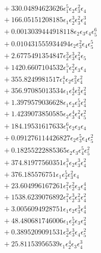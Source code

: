 \documentclass[10pt]{article}
\begin{document}
\begin{align*}
&{}  + 330.04894623626 \epsilon_{1}^{5} \epsilon_{2} \epsilon_{3}^{2} \epsilon_{4} \\
&{}  + 166.05151208185 \epsilon_{1} \epsilon_{2}^{3} \epsilon_{3}^{2} \epsilon_{4}^{3} \\
&{}  + 0.0013039444918118 \epsilon_{2} \epsilon_{3} \epsilon_{4} \epsilon_{5}^{6} \\
&{}  + 0.010431555934494 \epsilon_{2} \epsilon_{3}^{2} \epsilon_{4} \epsilon_{5}^{5} \\
&{}  + 2.6775491354847 \epsilon_{2}^{3} \epsilon_{3}^{3} \epsilon_{4}^{2} \epsilon_{5} \\
&{}  + 1420.6607104532 \epsilon_{1}^{5} \epsilon_{2}^{2} \epsilon_{3} \epsilon_{4} \\
&{}  + 355.8249981517 \epsilon_{1}^{4} \epsilon_{2} \epsilon_{3}^{2} \epsilon_{4}^{2} \\
&{}  + 356.97085013534 \epsilon_{1} \epsilon_{2}^{4} \epsilon_{3}^{2} \epsilon_{4}^{2} \\
&{}  + 1.3979579036628 \epsilon_{1} \epsilon_{2} \epsilon_{3}^{5} \epsilon_{4}^{2} \\
&{}  + 1.4239073850585 \epsilon_{2} \epsilon_{3}^{4} \epsilon_{4}^{2} \epsilon_{5}^{2} \\
&{}  + 184.19531617633 \epsilon_{1}^{6} \epsilon_{2} \epsilon_{3} \epsilon_{4} \\
&{}  + 0.091276114426827 \epsilon_{2} \epsilon_{3}^{5} \epsilon_{4} \epsilon_{5}^{2} \\
&{}  + 0.18255222885365 \epsilon_{2} \epsilon_{3} \epsilon_{4}^{5} \epsilon_{5}^{2} \\
&{}  + 374.81977560351 \epsilon_{1}^{3} \epsilon_{2} \epsilon_{3}^{3} \epsilon_{4}^{2} \\
&{}  + 376.185576751 \epsilon_{1} \epsilon_{2}^{5} \epsilon_{3}^{2} \epsilon_{4} \\
&{}  + 23.604996167261 \epsilon_{1}^{2} \epsilon_{2}^{2} \epsilon_{3} \epsilon_{4}^{4} \\
&{}  + 1538.6239076892 \epsilon_{1}^{2} \epsilon_{2}^{3} \epsilon_{3}^{2} \epsilon_{4}^{2} \\
&{}  + 3.0056094928751 \epsilon_{1} \epsilon_{2} \epsilon_{3}^{3} \epsilon_{4}^{4} \\
&{}  + 48.480681746006 \epsilon_{1} \epsilon_{2}^{5} \epsilon_{3} \epsilon_{4}^{2} \\
&{}  + 0.3895209091531 \epsilon_{2}^{3} \epsilon_{3}^{3} \epsilon_{4} \epsilon_{5}^{2} \\
&{}  + 25.81153956539 \epsilon_{1} \epsilon_{2}^{4} \epsilon_{3} \epsilon_{4}^{3} \\

\end{align*}
\end{document}
